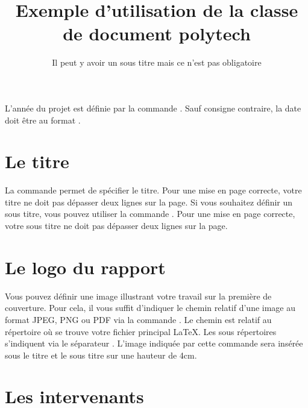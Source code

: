 \documentclass[overfullbox,hideweeklyreports,noseparatecontributorspage,nodate]{polytech}
\begin{document}
L'année du projet est définie par la commande . Sauf consigne contraire, la date doit être au format .
\begin{latexsource}
\end{latexsource}

\section{Le titre}

La commande  permet de spécifier le titre. Pour une mise en page correcte, votre titre ne doit pas dépasser deux lignes sur la page. Si vous souhaitez définir un sous titre, vous pouvez utiliser la commande . Pour une mise en page correcte, votre sous titre ne doit pas dépasser deux lignes sur la page.

\begin{latexsource}
\title{Exemple d'utilisation de la classe de document polytech}
\subtitle{Il peut y avoir un sous titre mais ce n'est pas obligatoire}
\end{latexsource}

\section{Le logo du rapport}

Vous pouvez définir une image illustrant votre travail sur la première de couverture. Pour cela, il vous suffit d'indiquer le chemin relatif d'une image au format JPEG, PNG ou PDF via la commande . Le chemin est relatif au répertoire où se trouve votre fichier principal \LaTeX. Les sous répertoires s'indiquent via le séparateur \latexcode{/}. L'image indiquée par cette commande sera insérée sous le titre et le sous titre sur une hauteur de 4cm.

\begin{latexsource}
\end{latexsource}

\section{Les intervenants}

\label{sec:intervenants}
\end{document}
